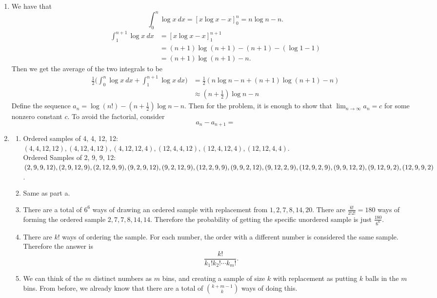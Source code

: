 \documentclass{article}
\begin{document}
\begin{enumerate}
    \item We have that 
    \[ \int_{0}^{n} \log{x} \ dx = [x\log{x} - x]_{0}^{n} = n\log{n} - n. \]
    \begin{align*}
        \int_{1}^{n + 1} \log{x} \ dx 
        &= [x\log{x} - x]_{1}^{n + 1} \\
        &= (n + 1)\log{(n + 1)} - (n + 1) - (\log{1} - 1) \\
        &= (n + 1)\log{(n + 1)} - n.
    \end{align*}
    Then we get the average of the two integrals to be 
    \begin{align*}
        \frac{1}{2} \Big( \int_{0}^{n} \log{x} \ dx + \int_{1}^{n + 1} \log{x} \ dx \Big)
        &= \frac{1}{2}(n\log{n} - n + (n + 1)\log{(n + 1)} - n) \\
        &\approx (n + \frac{1}{2})\log{n} - n
    \end{align*}
    Define the sequence $a_n = \log{(n!)} - (n + \frac{1}{2})\log{n} - n$. Then for the 
    problem, it is enough to show that $\lim_{n \to \infty} a_n = c$ for some nonzero constant 
    $c$. To avoid the factorial, consider 
    \[ a_n - a_{n + 1} = \]

    \item \begin{enumerate}
        \item Ordered samples of {4, 4, 12, 12}: \\
        $(4, 4, 12, 12), (4, 12, 4, 12), (4, 12, 12, 4), (12, 4, 4, 12), (12, 4, 12, 4), 
        (12, 12, 4, 4)$. \\
        Ordered Samples of {2, 9, 9, 12}: \\
        $(2, 9, 9, 12), (2, 9, 12, 9), (2, 12, 9, 9), (9, 2, 9, 12), (9, 2, 12, 9), 
        (12, 2, 9, 9), \\ (9, 9, 2, 12), (9, 12, 2, 9), (12, 9, 2, 9), (9, 9, 12, 2), 
        (9, 12, 9, 2), (12, 9, 9, 2)$.

        \item Same as part a.
        
        \item There are a total of $6^6$ ways of drawing an ordered sample with replacement from 
        ${1, 2, 7, 8, 14, 20}$. There are $\frac{6!}{2!2!} = 180$ ways of forming the ordered 
        sample ${2, 7, 7, 8, 14, 14}$. Therefore the probability of getting the specific 
        unordered sample is just $\frac{180}{6^6}$. 

        \item There are $k!$ ways of ordering the sample. For each number, the order with a 
        different number is considered the same sample. Therefore the answer is 
        \[ \frac{k!}{k_1!k_2!\cdots k_m!}. \]

        \item We can think of the $m$ distinct numbers as $m$ bins, and creating a sample of 
        size $k$ with replacement as putting $k$ balls in the $m$ bins. From before, we 
        already know that there are a total of $\binom{k + m - 1}{k}$ ways of doing this.
    \end{enumerate}
\end{enumerate}
\end{document}
